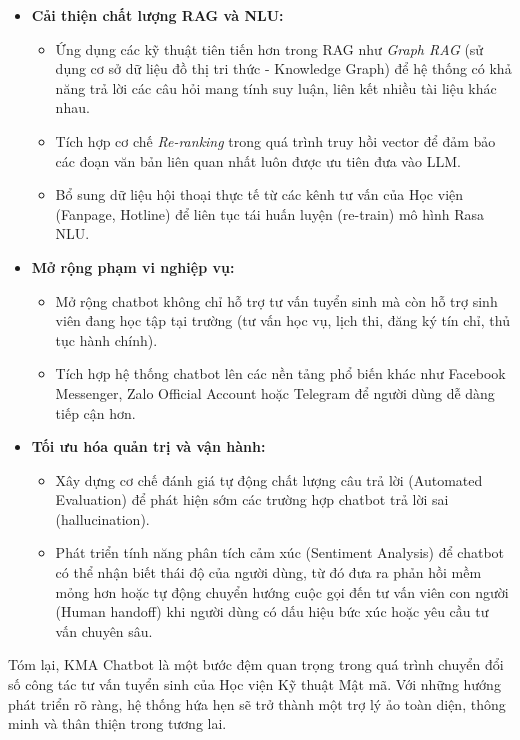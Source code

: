 \begin{itemize}
    \item \textbf{Cải thiện chất lượng RAG và NLU:} 
    \begin{itemize}
        \item Ứng dụng các kỹ thuật tiên tiến hơn trong RAG như \textit{Graph RAG} (sử dụng cơ sở dữ liệu đồ thị tri thức - Knowledge Graph) để hệ thống có khả năng trả lời các câu hỏi mang tính suy luận, liên kết nhiều tài liệu khác nhau.
        \item Tích hợp cơ chế \textit{Re-ranking} trong quá trình truy hồi vector để đảm bảo các đoạn văn bản liên quan nhất luôn được ưu tiên đưa vào LLM.
        \item Bổ sung dữ liệu hội thoại thực tế từ các kênh tư vấn của Học viện (Fanpage, Hotline) để liên tục tái huấn luyện (re-train) mô hình Rasa NLU.
    \end{itemize}
    
    \item \textbf{Mở rộng phạm vi nghiệp vụ:} 
    \begin{itemize}
        \item Mở rộng chatbot không chỉ hỗ trợ tư vấn tuyển sinh mà còn hỗ trợ sinh viên đang học tập tại trường (tư vấn học vụ, lịch thi, đăng ký tín chỉ, thủ tục hành chính).
        \item Tích hợp hệ thống chatbot lên các nền tảng phổ biến khác như Facebook Messenger, Zalo Official Account hoặc Telegram để người dùng dễ dàng tiếp cận hơn.
    \end{itemize}
    
    \item \textbf{Tối ưu hóa quản trị và vận hành:}
    \begin{itemize}
        \item Xây dựng cơ chế đánh giá tự động chất lượng câu trả lời (Automated Evaluation) để phát hiện sớm các trường hợp chatbot trả lời sai (hallucination).
        \item Phát triển tính năng phân tích cảm xúc (Sentiment Analysis) để chatbot có thể nhận biết thái độ của người dùng, từ đó đưa ra phản hồi mềm mỏng hơn hoặc tự động chuyển hướng cuộc gọi đến tư vấn viên con người (Human handoff) khi người dùng có dấu hiệu bức xúc hoặc yêu cầu tư vấn chuyên sâu.
    \end{itemize}
\end{itemize}

Tóm lại, KMA Chatbot là một bước đệm quan trọng trong quá trình chuyển đổi số công tác tư vấn tuyển sinh của Học viện Kỹ thuật Mật mã. Với những hướng phát triển rõ ràng, hệ thống hứa hẹn sẽ trở thành một trợ lý ảo toàn diện, thông minh và thân thiện trong tương lai.
